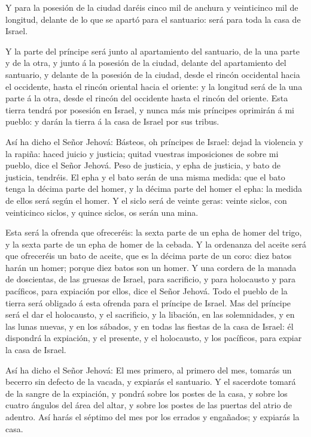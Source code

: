  Y para la posesión de la ciudad daréis cinco mil de anchura
y veinticinco mil de longitud, delante de lo que se apartó para el
santuario: será para toda la casa de Israel.

 Y la parte del príncipe será junto al apartamiento del
santuario, de la una parte y de la otra, y junto á la posesión de la
ciudad, delante del apartamiento del santuario, y delante de la posesión
de la ciudad, desde el rincón occidental hacia el occidente, hasta el
rincón oriental hacia el oriente: y la longitud será de la una parte á
la otra, desde el rincón del occidente hasta el rincón del oriente.
 Esta tierra tendrá por posesión en Israel, y nunca más mis
príncipes oprimirán á mi pueblo: y darán la tierra á la casa de Israel
por sus tribus.

 Así ha dicho el Señor Jehová: Básteos, oh príncipes de
Israel: dejad la violencia y la rapiña: haced juicio y justicia; quitad
vuestras imposiciones de sobre mi pueblo, dice el Señor Jehová.
 Peso de justicia, y epha de justicia, y bato de justicia,
tendréis.  El epha y el bato serán de una misma medida: que
el bato tenga la décima parte del homer, y la décima parte del homer el
epha: la medida de ellos será según el homer.  Y el siclo
será de veinte geras: veinte siclos, con veinticinco siclos, y quince
siclos, os serán una mina.

 Esta será la ofrenda que ofreceréis: la sexta parte de un
epha de homer del trigo, y la sexta parte de un epha de homer de la
cebada.  Y la ordenanza del aceite será que ofreceréis un
bato de aceite, que es la décima parte de un coro: diez batos harán un
homer; porque diez batos son un homer.  Y una cordera de la
manada de doscientas, de las gruesas de Israel, para sacrificio, y para
holocausto y para pacíficos, para expiación por ellos, dice el Señor
Jehová.  Todo el pueblo de la tierra será obligado á esta
ofrenda para el príncipe de Israel.  Mas del príncipe será
el dar el holocausto, y el sacrificio, y la libación, en las
solemnidades, y en las lunas nuevas, y en los sábados, y en todas las
fiestas de la casa de Israel: él dispondrá la expiación, y el presente,
y el holocausto, y los pacíficos, para expiar la casa de Israel.

 Así ha dicho el Señor Jehová: El mes primero, al primero
del mes, tomarás un becerro sin defecto de la vacada, y expiarás el
santuario.  Y el sacerdote tomará de la sangre de la
expiación, y pondrá sobre los postes de la casa, y sobre los cuatro
ángulos del área del altar, y sobre los postes de las puertas del atrio
de adentro.  Así harás el séptimo del mes por los errados y
engañados; y expiarás la casa.

